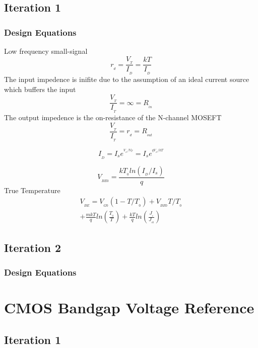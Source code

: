 \documentclass[conference]{IEEEtran}
\begin{document}
\subsection{Iteration 1}
\subsubsection{Design Equations}

Low frequency small-signal
\begin{equation}
  r_{_d} = \frac{V_{_T}}{I_{_D}} = \frac{kT}{I_{_D}}
\end{equation}
The input impedence is inifite due to the assumption of an ideal current source which buffers the input
\begin{equation}
  \frac{V_{_T}}{I_{_T}} = \infty = R_{_{in}}
\end{equation}
The output impedence is the on-resistance of the N-channel MOSEFT
\begin{equation}
  \frac{V_{_T}}{I_{_T}} = r_{_d} = R_{_{out}}
\end{equation}

\begin{equation}
  I_{_D} = I_se^{^{V_{_D}/V_{T}}} = I_se^{^{qV_{_D}/kT}}
\end{equation}

\begin{equation}
  V_{_{BE0}} = \frac{kT_{_0}ln(I_{_D}/I_s)}{q}
\end{equation}
True Temperature
\begin{multline}
  V_{_{BE}} = V_{_{G0}}(1 - T/T_{_0}) + V_{_{BE0}}T/T_{_0}\\+ \frac{mkT}{q}ln(\frac{T_{_0}}{T}) + \frac{kT}{q}ln(\frac{J_{_c}}{J_{_{c0}}}) 
\end{multline}

\subsection{Iteration 2}
\subsubsection{Design Equations}

\section{CMOS Bandgap Voltage Reference}
\subsection{Iteration 1}
\end{document}
